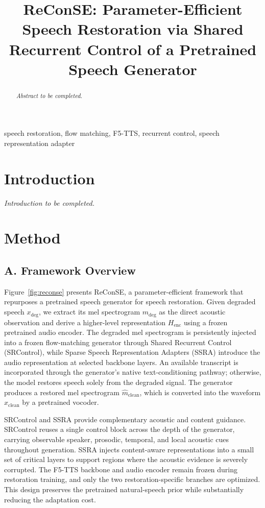 \documentclass{article}
\title{ReConSE: Parameter-Efficient Speech Restoration via Shared Recurrent Control of a Pretrained Speech Generator}
\begin{document}
\ninept
\maketitle

\begin{abstract}
\textit{Abstract to be completed.}
\end{abstract}

\begin{keywords}
speech restoration, flow matching, F5-TTS, recurrent control, speech representation adapter
\end{keywords}

\section{Introduction}
\textit{Introduction to be completed.}

\section{Method}

\subsection{A. Framework Overview}

Figure~\ref{fig:reconse} presents ReConSE, a parameter-efficient framework that repurposes a pretrained speech generator for speech restoration. Given degraded speech $x_{\mathrm{deg}}$, we extract its mel spectrogram $m_{\mathrm{deg}}$ as the direct acoustic observation and derive a higher-level representation $H_{\mathrm{enc}}$ using a frozen pretrained audio encoder. The degraded mel spectrogram is persistently injected into a frozen flow-matching generator through Shared Recurrent Control (SRControl), while Sparse Speech Representation Adapters (SSRA) introduce the audio representation at selected backbone layers. An available transcript is incorporated through the generator's native text-conditioning pathway; otherwise, the model restores speech solely from the degraded signal. The generator produces a restored mel spectrogram $\hat{m}_{\mathrm{clean}}$, which is converted into the waveform $\hat{x}_{\mathrm{clean}}$ by a pretrained vocoder.

SRControl and SSRA provide complementary acoustic and content guidance. SRControl reuses a single control block across the depth of the generator, carrying observable speaker, prosodic, temporal, and local acoustic cues throughout generation. SSRA injects content-aware representations into a small set of critical layers to support regions where the acoustic evidence is severely corrupted. The F5-TTS backbone and audio encoder remain frozen during restoration training, and only the two restoration-specific branches are optimized. This design preserves the pretrained natural-speech prior while substantially reducing the adaptation cost.
\end{document}
